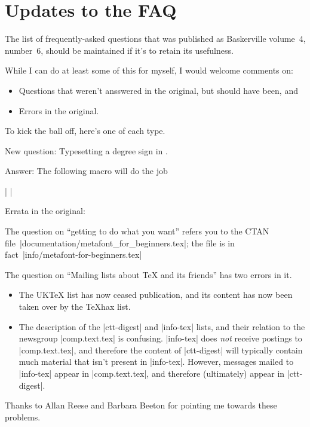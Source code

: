 \section{Updates to the FAQ}

The list of frequently-asked questions that was published as
Baskerville volume~4, number~6, should be maintained if it's to retain
its usefulness.

While I can do at least some of this for myself, I would welcome
comments on:
\begin{itemize}
\item Questions that weren't ansswered in the original, but should
  have been, and
\item Errors in the original.
\end{itemize}

To kick the ball off, here's one of each type.

New question: Typesetting a degree sign in \LaTeXe{}.

Answer: The following macro will do the job

|  \newcommand{\degree}[1][]{\ensuremath{{#1}^\circ}}|

Errata in the original:

The question on ``getting \MF{} to do what you want'' refers you to the
CTAN file~|documentation/metafont_for_beginners.tex|; the file is in
fact~|info/metafont-for-beginners.tex|

The question on ``Mailing lists about \TeX{} and its friends'' has two
errors in it.

\begin{itemize}
\item The UK\TeX{} list has now ceased publication, and its content
      has now been taken over by the \TeX{}hax list.
\item The description of the |ctt-digest| and |info-tex| lists, and
      their relation to the newsgroup |comp.text.tex| is confusing.
      |info-tex| does \emph{not} receive postings to |comp.text.tex|,
      and therefore the content of |ctt-digest| will typically contain
      much material that isn't present in |info-tex|.  However,
      messages mailed to |info-tex| appear in |comp.text.tex|, and
      therefore (ultimately) appear in |ctt-digest|.
\end{itemize}

Thanks to Allan Reese and Barbara Beeton for pointing me towards these
problems.
